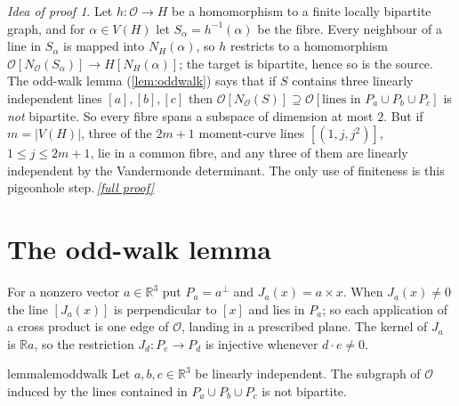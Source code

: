 \documentclass[11pt,a4paper]{article}
\theoremstyle{plain}
\theoremstyle{definition}
\theoremstyle{remark}
\newtheorem*{proofidea}{Idea of proof}
\newcommand{\fullproofref}[1]{\,\hyperref[#1]{\textit{[full proof]}}}
\newcommand{\cO}{\mathcal O}
\newcommand{\R}{\mathbb R}
\newcommand{\Nb}{N_{\cO}}
\newcommand{\Jm}[1]{J_{#1}}
\newcommand{\Pl}[1]{P_{#1}}
\begin{document}
\begin{proofidea}
Let $h\colon\cO\to H$ be a homomorphism to a finite locally bipartite graph, and for $\alpha\in V(H)$ let $S_\alpha=h^{-1}(\alpha)$ be the fibre. Every neighbour of a line in $S_\alpha$ is mapped into $N_H(\alpha)$, so $h$ restricts to a homomorphism $\cO[\Nb(S_\alpha)]\to H[N_H(\alpha)]$; the target is bipartite, hence so is the source. The odd-walk lemma (\cref{lem:oddwalk}) says that if $S$ contains three linearly independent lines $[a],[b],[c]$ then $\cO[\Nb(S)]\supseteq\cO[\text{lines in }\Pl a\cup\Pl b\cup\Pl c]$ is \emph{not} bipartite. So every fibre spans a subspace of dimension at most $2$. But if $m=|V(H)|$, three of the $2m+1$ moment-curve lines $[(1,j,j^2)]$, $1\le j\le 2m+1$, lie in a common fibre, and any three of them are linearly independent by the Vandermonde determinant. The only use of finiteness is this pigeonhole step.\fullproofref{pf:main}
\end{proofidea}

\section{The odd-walk lemma}

For a nonzero vector $a\in\R^3$ put $\Pl a=a^\perp$ and $\Jm a(x)=a\times x$. When $\Jm a(x)\ne0$ the line $[\Jm a(x)]$ is perpendicular to $[x]$ and lies in $\Pl a$; so each application of a cross product is one edge of $\cO$, landing in a prescribed plane. The kernel of $\Jm a$ is $\R a$, so the restriction $\Jm d\colon\Pl e\to\Pl d$ is injective whenever $d\cdot e\ne0$.

\begin{restatable}{lemma}{lemoddwalk}\label{lem:oddwalk}
Let $a,b,c\in\R^3$ be linearly independent. The subgraph of $\cO$ induced by the lines contained in $\Pl a\cup\Pl b\cup\Pl c$ is not bipartite.
\end{restatable}
\end{document}
